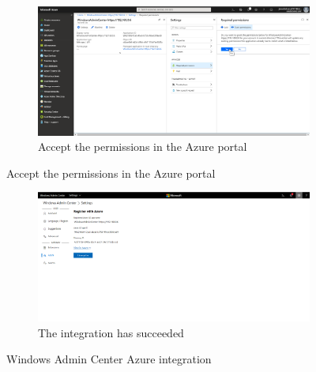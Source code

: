 \begin{figure}[h]\ContinuedFloat
\begin{subfigure}{\textwidth}
		\captionsetup{width=0.7\linewidth}
		\includegraphics[width=0.75\linewidth]{img/StandVanZaken/WAC3.png} 
		\centering
		\caption{Accept the permissions in the Azure portal}
	\end{subfigure}
\end{figure}
\begin{figure}[h]\ContinuedFloat
	\begin{subfigure}{\textwidth}
		\captionsetup{width=0.7\linewidth}
		\includegraphics[width=0.75\linewidth]{img/StandVanZaken/WAC4.png}
		\centering
		\caption{The integration has succeeded}
	\end{subfigure}
	\caption[WAC Azure integration]{Windows Admin Center Azure integration}
	\label{fig:WACAzure}
\end{figure}